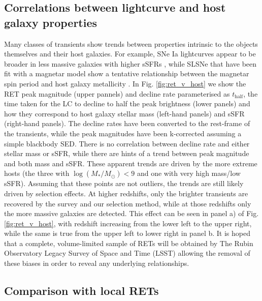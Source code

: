\documentclass[fleqn,usenatbib,]{mnras}
\newcommand{\replychris}[1]{\color{magenta}#1 \color{black}}
\begin{document}
\subsection{Correlations between lightcurve and host galaxy properties \label{subsec:disc_correlations}}
Many classes of transients show trends between properties intrinsic to the objects themselves and their host galaxies. For example, SNe Ia lightcurves appear to be broader in less massive galaxies with higher sSFR\replychris{s} \citep{Sullivan2006,Neill2009,Howell2009,Sullivan2010,Roman2018,Kelsey2020}, while SLSNe that have been fit with a magnetar model show a tentative relationship between the magnetar spin period and host galaxy metallicity \citep{Chen2016a}. In Fig. \ref{fig:ret_v_host} we show the RET peak magnitude (upper pannels) and decline rate parameterised as $t_{\mathrm{half}}$, the time taken for the LC to decline to half the peak brightness (lower panels) and how they correspond to host galaxy stellar mass (left-hand panels) and sSFR (right-hand panels). The decline rates have been converted to the rest-frame of the transients, while the peak magnitudes have been k-corrected assuming a simple blackbody SED. There is no correlation between decline rate and either stellar mass or sSFR, while there are hints of a trend between peak magnitude and both mass and sSFR. These apparent trends are driven by the more extreme hosts (the three with $\log\left(M_*/M_{\odot}\right) < 9$ and one with very high mass/low sSFR). Assuming that these points are not outliers, the trends are still likely driven by selection effects. At higher redshifts, only the brighter transients are recovered by the survey and our selection method, while at those redshifts only the more massive galaxies are detected. This effect can be seen in panel a) of Fig. \ref{fig:ret_v_host}, with redshift increasing from the lower left to the upper right, while the same is true from the upper left to lower right in panel b. It is hoped that a complete, volume-limited sample of RETs will be obtained by The Rubin Observatory Legacy Survey of Space and Time (LSST) allowing the removal of these biases in order to reveal any underlying relationships.

\subsection{Comparison with local RETs \label{subsec:disc_lowz}}
\end{document}

